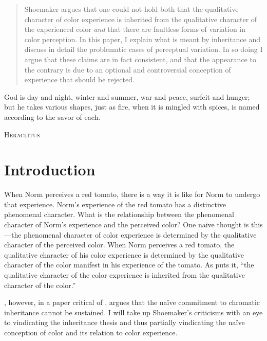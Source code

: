 \documentclass[12pt]{article}
\begin{document}
\maketitle

\begin{abstract}
	\noindent Shoemaker argues that one could not hold both that the qualitative character of color experience is inherited from the qualitative character of the experienced color \emph{and} that there are faultless forms of variation in color perception. In this paper, I explain what is meant by inheritance and discuss in detail the problematic cases of perceptual variation. In so doing I argue that these claims are in fact consistent, and that the appearance to the contrary is due to an optional and controversial conception of experience that should be rejected.
\end{abstract}

\setlength{\parindent}{1em}

\epigraph{God is day and night, winter and summer, war and peace, surfeit and hunger; but he takes various shapes, just as fire, when it is mingled with spices, is named according to the savor of each.}{\textsc{Heraclitus}}

\section{Introduction}\label{sec:introduction} 

When Norm perceives a red tomato, there is a way it is like for Norm to undergo that experience. Norm's experience of the red tomato has a distinctive phenomenal character. What is the relationship between the phenomenal character of Norm's experience and the perceived color? One na\"ive thought is this---the phenomenal character of color experience is determined by the qualitative character of the perceived color. When Norm perceives a red tomato, the qualitative character of his color experience is determined by the qualitative character of the color manifest in his experience of the tomato. As \citet[189]{Campbell:1997dq} puts it, ``the qualitative character of the color experience is inherited from the qualitative character of the color.''

\cite{Shoemaker:wk}, however, in a paper critical of \cite{Hilbert:2000on}, argues that the na\"ive commitment to chromatic inheritance cannot be sustained. I will take up Shoemaker's criticisms with an eye to vindicating the inheritance thesis and thus partially vindicating the na\"ive conception of color and its relation to color experience.
\end{document}
